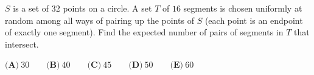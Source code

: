 $S$ is a set of $32$ points on a circle. A set $T$ of $16$ segments is chosen uniformly at random among all ways of pairing up the points of $S$ (each point is an endpoint of exactly one segment). Find the expected number of pairs of segments in $T$ that intersect.

$\textbf{(A)}\ 30\qquad\textbf{(B)}\ 40\qquad\textbf{(C)}\ 45\qquad\textbf{(D)}\ 50\qquad\textbf{(E)}\ 60$
